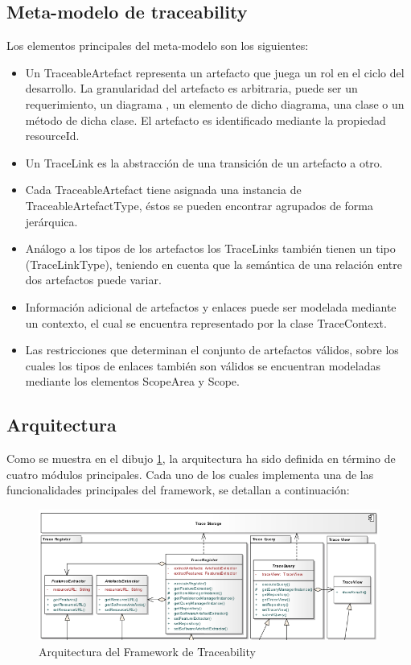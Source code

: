 \documentclass[a4paper,12pt,oneside,spanish]{book}
\begin{document}
\subsection{Meta-modelo de traceability}

Los elementos principales del meta-modelo son los siguientes:

\begin{itemize}
\item Un TraceableArtefact representa un artefacto que juega un rol en el ciclo del desarrollo. La granularidad del artefacto es arbitraria, puede ser un requerimiento, un diagrama , un elemento de dicho diagrama, una clase o un método de dicha clase. El artefacto es identificado mediante la propiedad resourceId.
\item Un TraceLink es la abstracción de una transición de un artefacto a otro.
\item Cada TraceableArtefact tiene asignada una instancia de TraceableArtefactType, éstos se pueden encontrar agrupados de forma jerárquica.
 \item Análogo a los tipos de los artefactos los TraceLinks también tienen un tipo (TraceLinkType), teniendo en cuenta que la semántica de una relación entre dos artefactos puede variar.
\item Información adicional de artefactos y enlaces puede ser modelada mediante un contexto, el cual se encuentra representado por la clase TraceContext.
\item Las restricciones que determinan el conjunto de artefactos válidos, sobre los cuales los tipos de enlaces también son válidos se encuentran modeladas mediante los elementos ScopeArea y Scope.
\end{itemize}

\subsection{Arquitectura}

Como se muestra en el dibujo \ref{fig:SPLArquitectura}, la arquitectura ha sido definida en término de cuatro módulos principales. Cada uno de los cuales implementa una de las funcionalidades principales del framework, se detallan a continuación:

\begin{figure}[hbtp]
\centering
\includegraphics[scale=.55]{./img/ArquitecturaTraceabilityFramework}
\caption{Arquitectura del Framework de Traceability}
\label{fig:SPLArquitectura}
\end{figure}
\end{document}

